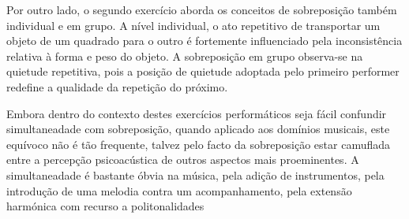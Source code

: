 \documentclass[../main.tex]{subfiles}
\begin{document}
Por outro lado, o segundo exercício aborda os conceitos de sobreposição também individual e em grupo. A nível individual, o ato repetitivo de transportar um objeto de um quadrado para o outro é fortemente influenciado pela inconsistência relativa à forma e peso do objeto. A sobreposição em grupo observa-se na quietude repetitiva, pois a posição de quietude adoptada pelo primeiro performer redefine a qualidade da repetição do próximo.

Embora dentro do contexto destes exercícios performáticos seja fácil confundir simultaneadade com sobreposição, quando aplicado aos domínios musicais, este equívoco não é tão frequente, talvez pelo facto da sobreposição estar camuflada entre a percepção psicoacústica de outros aspectos mais proeminentes. A simultaneadade é bastante óbvia na música, pela adição de instrumentos, pela introdução de uma melodia contra um acompanhamento, pela extensão harmónica com recurso a politonalidades
\end{document}
